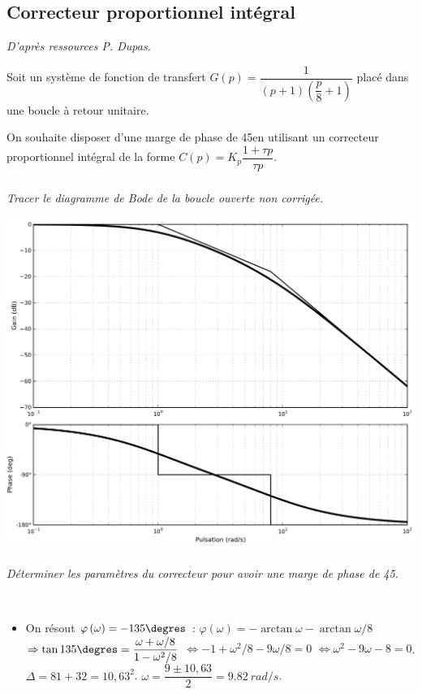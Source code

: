 \documentclass[10pt,fleqn]{article} %
\begin{document}
\begin{multicols}{2}
\subsection*{Correcteur proportionnel intégral}
\textit{D'après ressources P. Dupas.}
\setcounter{exo}{0}

Soit un système de fonction de transfert $G(p)=\dfrac{1}{\left(p+1\right)\left(\dfrac{p}{8}+1\right)}$ placé dans une boucle à retour unitaire.

On souhaite disposer d'une marge de phase de 45\degres en utilisant un correcteur proportionnel intégral de la forme $C(p)=K_p\dfrac{1+\tau p}{\tau p}$.

\subparagraph{}\textit{Tracer le diagramme de Bode de la boucle ouverte non corrigée.}
\ifprof
\begin{corrige}
\begin{center}
\includegraphics[width=\linewidth]{images/PI_BodeNC}
\end{center}
\end{corrige}
\else
\fi

\subparagraph{}\textit{Déterminer les paramètres du correcteur pour avoir une marge de phase de 45\degres. }

\ifprof
\begin{corrige}~\\

\begin{itemize}
\item On résout $\varphi\left(\omega\right)=-135\degres$ : 
$\varphi\left(\omega\right)=-\arctan \omega-\arctan \omega/8 $ $\Rightarrow \tan 135\degres = \dfrac{\omega+\omega/8}{1-\omega^2/8}$ 
$\Leftrightarrow - 1+\omega^2/8-9\omega/8=0$ 
$\Leftrightarrow  \omega^2 -9\omega-8 =0$. 
$\Delta = 81+32=10,63^2$. 
$\omega = \dfrac{9\pm10,63}{2}=\SI{9,82}{rad/s}$.



\end{itemize}
\end{corrige}
\end{multicols}
\end{document}
